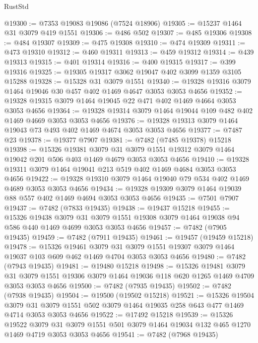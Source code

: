 \begin{lexlean}{RustStd}
\begin{coremodule}
@19300 := @7353 @19083 @19086 (@7524 @18906)
@19305 := @15237 @1464 @31 @3079 @419 @1551
@19306 := @486 @502
@19307 := @485 @19306
@19308 := @484 @19307
@19309 := @475 @19308
@19310 := @474 @19309
@19311 := @473 @19310
@19312 := @460 @19311
@19313 := @459 @19312
@19314 := @439 @19313
@19315 := @401 @19314
@19316 := @400 @19315
@19317 := @399 @19316
@19325 := @19305 @19317 @3062 @19047 @402 @3099 @1359 @3105 @15288
@19328 := @15328 @31 @3079 @1551
@19340 := @19328 @19316 @3079 @1464 @19046 @30 @457 @402 @1469 @4647 @3053 @3053 @4656
@19352 := @19328 @19315 @3079 @1464 @19045 @22 @471 @402 @1469 @4664 @3053 @3053 @4656
@19364 := @19328 @19314 @3079 @1464 @19044 @109 @482 @402 @1469 @4669 @3053 @3053 @4656
@19376 := @19328 @19313 @3079 @1464 @19043 @73 @493 @402 @1469 @4674 @3053 @3053 @4656
@19377 := @7487 @23
@19378 := @19377 @7907
@19381 := @7482 (@7485 @19378) @15218
@19398 := @15326
    @19381
    @3079
    @31
    @3079
    @1551
    @19312
    @3079
    @1464
    @19042
    @201
    @506
    @403
    @1469
    @4679
    @3053
    @3053
    @4656
@19410 := @19328 @19311 @3079 @1464 @19041 @213 @519 @402 @1469 @4684 @3053 @3053 @4656
@19422 := @19328 @19310 @3079 @1464 @19040 @79 @534 @402 @1469 @4689 @3053 @3053 @4656
@19434 := @19328 @19309 @3079 @1464 @19039 @88 @557 @402 @1469 @4694 @3053 @3053 @4656
@19435 := @7501 @7907
@19437 := @7482 (@7833 @19435)
@19438 := @19437 @15218
@19455 := @15326
    @19438
    @3079
    @31
    @3079
    @1551
    @19308
    @3079
    @1464
    @19038
    @94
    @586
    @440
    @1469
    @4699
    @3053
    @3053
    @4656
@19457 := @7482 (@7905 @19435)
@19459 := @7482 (@7911 @19435)
@19461 := @19457 (@19459 @15218)
@19478 := @15326
    @19461
    @3079
    @31
    @3079
    @1551
    @19307
    @3079
    @1464
    @19037
    @103
    @609
    @462
    @1469
    @4704
    @3053
    @3053
    @4656
@19480 := @7482 (@7943 @19435)
@19481 := @19480 @15218
@19498 := @15326
    @19481
    @3079
    @31
    @3079
    @1551
    @19306
    @3079
    @1464
    @19036
    @118
    @620
    @1265
    @1469
    @4709
    @3053
    @3053
    @4656
@19500 := @7482 (@7935 @19435)
@19502 := @7482 (@7938 @19435)
@19504 := @19500 (@19502 @15218)
@19521 := @15326
    @19504
    @3079
    @31
    @3079
    @1551
    @502
    @3079
    @1464
    @19035
    @258
    @643
    @477
    @1469
    @4714
    @3053
    @3053
    @4656
@19522 := @17492 @15218
@19539 := @15326
    @19522
    @3079
    @31
    @3079
    @1551
    @501
    @3079
    @1464
    @19034
    @132
    @465
    @1270
    @1469
    @4719
    @3053
    @3053
    @4656
@19541 := @7482 (@7968 @19435)

\end{coremodule}
\end{lexlean}
